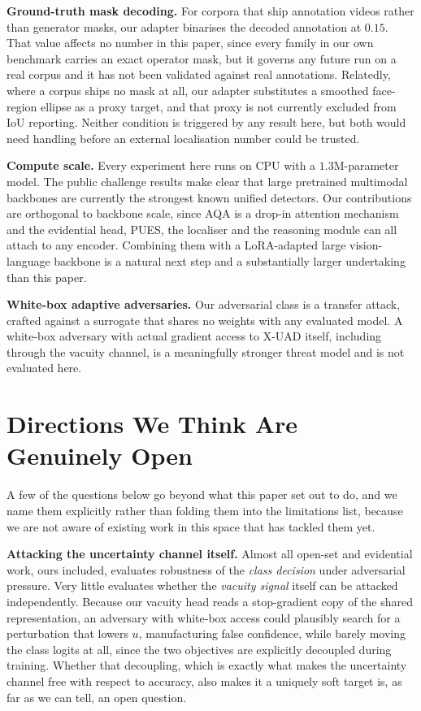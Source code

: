 \documentclass[conference]{IEEEtran}
\begin{document}
\textbf{Ground-truth mask decoding.} For corpora that ship annotation videos rather
than generator masks, our adapter binarises the decoded annotation at $0.15$. That
value affects no number in this paper, since every family in our own benchmark
carries an exact operator mask, but it governs any future run on a real corpus and it
has not been validated against real annotations. Relatedly, where a corpus ships no
mask at all, our adapter substitutes a smoothed face-region ellipse as a proxy
target, and that proxy is not currently excluded from IoU reporting. Neither
condition is triggered by any result here, but both would need handling before an
external localisation number could be trusted.

\textbf{Compute scale.} Every experiment here runs on CPU with a $1.3$M-parameter
model. The public challenge results \cite{ma2025uniattackplus} make clear that large
pretrained multimodal backbones are currently the strongest known unified detectors.
Our contributions are orthogonal to backbone scale, since AQA is a drop-in attention
mechanism and the evidential head, PUES, the localiser and the reasoning module can
all attach to any encoder. Combining them with a LoRA-adapted large vision-language
backbone is a natural next step and a substantially larger undertaking than this
paper.

\textbf{White-box adaptive adversaries.} Our adversarial class is a transfer attack,
crafted against a surrogate that shares no weights with any evaluated model. A
white-box adversary with actual gradient access to X-UAD itself, including through
the vacuity channel, is a meaningfully stronger threat model and is not evaluated
here.

\section{Directions We Think Are Genuinely Open}\label{sec:open}
A few of the questions below go beyond what this paper set out to do, and we name
them explicitly rather than folding them into the limitations list, because we are
not aware of existing work in this space that has tackled them yet.

\textbf{Attacking the uncertainty channel itself.} Almost all open-set and
evidential work, ours included, evaluates robustness of the \emph{class decision}
under adversarial pressure. Very little evaluates whether the \emph{vacuity signal}
itself can be attacked independently. Because our vacuity head reads a stop-gradient
copy of the shared representation, an adversary with white-box access could plausibly
search for a perturbation that lowers $u$, manufacturing false confidence, while
barely moving the class logits at all, since the two objectives are explicitly
decoupled during training. Whether that decoupling, which is exactly what makes the
uncertainty channel free with respect to accuracy, also makes it a uniquely soft
target is, as far as we can tell, an open question.
\end{document}
